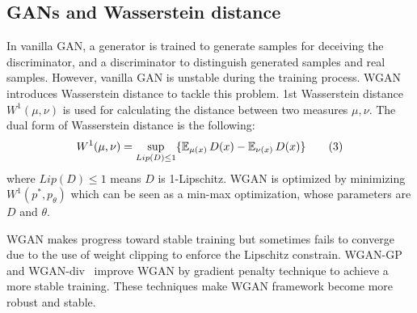 \subsection{GANs and Wasserstein distance}

In vanilla GAN, a generator is trained to generate samples for deceiving the discriminator, and a discriminator to distinguish generated samples and real samples. However, vanilla GAN is unstable during the training process. WGAN introduces Wasserstein distance to tackle this problem. 1st Wasserstein distance $W^1(\mu, \nu)$ is used for calculating the distance between two measures $\mu, \nu$. The dual form of Wasserstein distance is the following:
\begin{align*} \label{eq:Wasserstein-distance}
W^1(\mu, \nu) = \sup_{Lip(D) \leq 1} \{\operatorname{\mathbb{E}}_{\mu(x)} D(x)  - \operatorname{\mathbb{E}}_{\nu(x)} D(x)\} \tag{3}
\end{align*}
where $Lip(D) \leq 1$ means $D$ is 1-Lipschitz. WGAN is optimized by minimizing $W^1(p^*, p_\theta)$ which can be seen as a min-max optimization, whose parameters are $D$ and $\theta$. 

WGAN makes progress toward stable training but sometimes fails to converge due to the use of weight clipping to enforce the Lipschitz constrain. WGAN-GP~\cite{gulrajani2017improved} and WGAN-div~\cite{wu2018wasserstein} improve WGAN by gradient penalty technique to achieve a more stable training. These techniques make WGAN framework become more robust and stable. 

